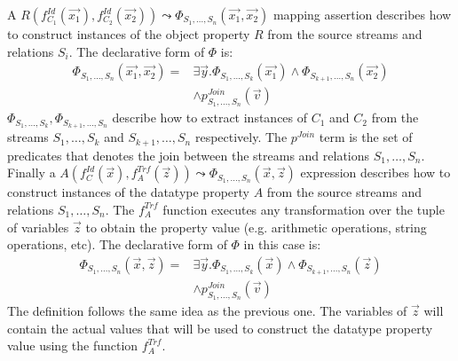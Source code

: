 A $R(f_{C_1}^{Id}(\vec{x_1}),f_{C_2}^{Id}(\vec{x_2})) \leadsto \Phi_{S_1,\ldots,S_n}(\vec{x_1},\vec{x_2})$ mapping assertion describes how to construct instances of the object property $R$ from the source streams and relations $S_i$. The declarative form of $\Phi$ is:
\begin{align*}
\Phi_{S_1,\ldots,S_n}(\vec{x_1},\vec{x_2})= &\exists\vec{y}.\Phi_{S_1,\ldots,S_k}(\vec{x_1}) \wedge \Phi_{S_{k+1},\ldots,S_n}(\vec{x_2}) \\ & \wedge p_{S_1,\ldots,S_n}^{Join}(\vec{v})
%
\end{align*}
$\Phi_{S_1,\ldots,S_k}, \Phi_{S_{k+1},\ldots,S_n}$ describe how to extract instances of $C_1$ and $C_2$ from the streams $S_1,\ldots,S_k$ and $S_{k+1},\ldots,S_n$ respectively. The $p^{Join}$ term is the set of predicates that denotes the join between the streams and relations $S_1,\ldots,S_n$.
\\

Finally a $A(f_C^{Id}(\vec{x}),f_A^{Trf}(\vec{z})) \leadsto \Phi_{S_1,\ldots,S_n}(\vec{x},\vec{z})$ expression describes how to construct instances of the datatype property $A$ from the source streams and relations $S_1,\ldots,S_n$. The $f_A^{Trf}$ function executes any transformation over the tuple of variables $\vec{z}$ to obtain the property value (e.g. arithmetic operations, string operations, etc). The declarative form of $\Phi$ in this case is:
\begin{align*}
\Phi_{S_1,\ldots,S_n}(\vec{x},\vec{z})= & \exists\vec{y}.\Phi_{S_1,\ldots,S_k}(\vec{x})  \wedge \Phi_{S_{k+1},\ldots,S_n}(\vec{z}) \\ &\wedge p_{S_1,\ldots,S_n}^{Join}(\vec{v})
%
\end{align*}
The definition follows the same idea as the previous one. The variables of $\vec{z}$ will contain the actual values
that will be used to construct the datatype property value using the function $f_A^{Trf}$.
%

